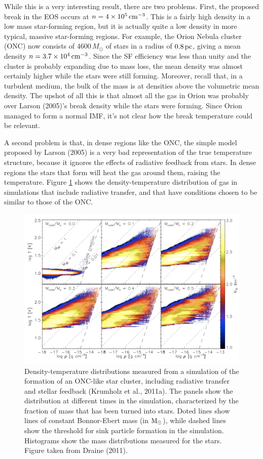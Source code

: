 \documentclass[a4paper,10pt]{article}
\begin{document}
{\noindent}While this is a very interesting result, there are two problems. First, the proposed break in the EOS occurs at $n=4\times10^5\,{\rm cm^{-3}}$. This is a fairly high density in a low mass star-forming region, but it is actually quite a low density in more typical, massive star-forming regions. For example, the Orion Nebula cluster (ONC) now consists of $4600\,{M_\odot}$ of stars in a radius of $0.8\,{\rm pc}$, giving a mean density $n=3.7\times10^4\,{\rm cm^{-3}}$. Since the SF efficiency was less than unity and the cluster is probably expanding due to mass loss, the mean density was almost certainly higher while the stars were still forming. Moreover, recall that, in a turbulent medium, the bulk of the mass is at densities above the volumetric mean density. The upshot of all this is that almost all the gas in Orion was probably over Larson (2005)'s break density while the stars were forming. Since Orion managed to form a normal IMF, it's not clear how the break temperature could be relevant.

{\noindent}A second problem is that, in dense regions like the ONC, the simple model proposed by Larson (2005) is a very bad representation of the true temperature structure, because it ignores the effects of radiative feedback from stars. In dense regions the stars that form will heat the gas around them, raising the temperature. Figure \ref{fig:tvsrho_feedback} shows the density-temperature distribution of gas in simulations that include radiative transfer, and that have conditions chosen to be similar to those of the ONC.

\begin{figure}[t]
    \centering
    \includegraphics[width=16cm]{figures/TvsRho_feeback.png}
    \caption{\footnotesize{Density-temperature distributions measured from a simulation of the formation of an ONC-like star cluster, including radiative transfer and stellar feedback (Krumholz et al., 2011a). The panels show the distribution at different times in the simulation, characterized by the fraction of mass that has been turned into stars. Doted lines show lines of constant Bonnor-Ebert mass (in ${\rm M_\odot}$), while dashed lines show the threshold for sink particle formation in the simulation. Histograms show the mass distributions measured for the stars. Figure taken from Draine (2011).}}
    \label{fig:tvsrho_feedback}
\end{figure}
\end{document}
